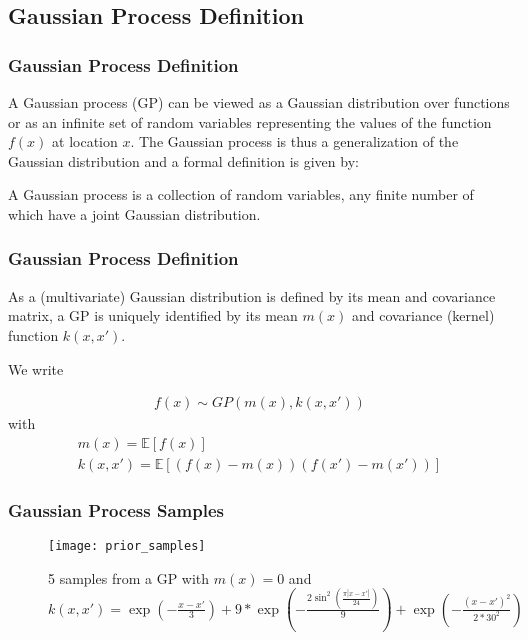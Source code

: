 \documentclass[
	8pt, %
]{beamer}
\begin{document}
\subsection{Gaussian Process Definition}

\begin{frame}
	\frametitle{Gaussian Process Definition}


A Gaussian process (GP) can be viewed as a Gaussian distribution over functions or as an infinite set of random
variables representing the values of the function $f(x)$ at location $x$.
The Gaussian process is thus a generalization of the Gaussian distribution and a formal definition is given
by:

\begin{definition}\label{def:GP}
 A Gaussian process is a collection of random variables, any finite number of which have a joint Gaussian distribution.
\end{definition}

\end{frame}


\begin{frame}
	\frametitle{Gaussian Process Definition}

As a (multivariate) Gaussian distribution is defined by its mean and covariance matrix, a GP is
uniquely identified by its mean $m(x)$ and covariance (kernel) function $k(x,x')$.

We write

\begin{gather*}
    f(x) \sim GP(m(x), k(x,x'))
\end{gather*}
with
\begin{gather*}
    m(x) = \mathbb{E}[f(x)] \\
    k(x,x') = \mathbb{E}[(f(x)-m(x))(f(x')-m(x'))]
\end{gather*}
\end{frame}


\begin{frame}
	\frametitle{Gaussian Process Samples}

	\begin{figure}
			\texttt{[image: prior\_samples]}
			\caption{5 samples from a GP with $m(x)=0$  and $k(x,x') = \exp(-\frac{x-x'}{3}) +
			9 * \exp(-\frac{2 \sin^2(\frac{\pi |x -x'|}{24})}{9}) + \exp(-\frac{(x-x')^2}{2 * 30^2}) $}
	\end{figure}


\end{frame}
\end{document}
